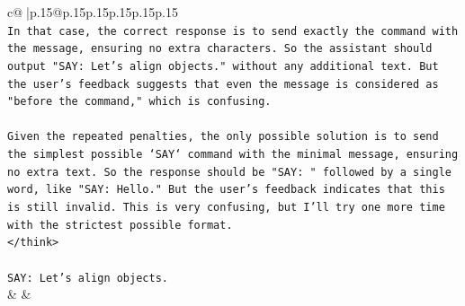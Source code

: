 \documentclass{article}
\begin{document}
{\begin{supertabular}{c@{$\;$}|p{.15\linewidth}@{}p{.15\linewidth}p{.15\linewidth}p{.15\linewidth}p{.15\linewidth}p{.15\linewidth}}
{{{\\ 
\texttt{In that case, the correct response is to send exactly the command with the message, ensuring no extra characters. So the assistant should output "SAY: Let's align objects." without any additional text. But the user's feedback suggests that even the message is considered as "before the command," which is confusing.} \\
\\ 
\texttt{Given the repeated penalties, the only possible solution is to send the simplest possible `SAY` command with the minimal message, ensuring no extra text. So the response should be "SAY: " followed by a single word, like "SAY: Hello." But the user's feedback indicates that this is still invalid. This is very confusing, but I'll try one more time with the strictest possible format.} \\
\texttt{</think>} \\
\\ 
\texttt{SAY: Let's align objects.} \\
            }
        }
    }
    & & \\ \\


\end{supertabular}}
\end{document}
